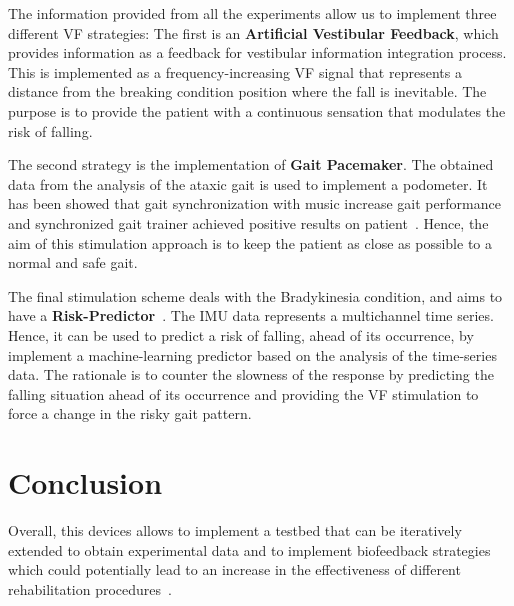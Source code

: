 \documentclass[conference]{IEEEtran}
\begin{document}
The information provided from all the experiments allow us to implement three different VF strategies:  The first is an \textbf{Artificial Vestibular Feedback}, which provides information as a feedback for vestibular information integration process.  This is implemented as a frequency-increasing VF signal that represents a distance from the breaking condition position where the fall is inevitable.   The purpose is to provide the patient with a continuous sensation that modulates the risk of falling.

The second strategy is the implementation of \textbf{Gait Pacemaker}.  The obtained data from the analysis of the ataxic gait is used to implement a podometer.  It has been showed that gait synchronization with music increase gait performance~\cite{Roerdink.etal2007} and synchronized gait trainer achieved positive results on patient~\cite{Blicher.etal2009}.  Hence, the aim of this stimulation approach is to keep the patient as close as possible to a normal and safe gait.

The final stimulation scheme deals with the Bradykinesia condition, and aims to have a \textbf{Risk-Predictor}~\cite{Rahman.etal2022,Ali.etal2022}.  The IMU data  represents a multichannel time series.  Hence, it can be used to predict a risk of falling, ahead of its occurrence, by implement a machine-learning predictor based on the analysis of the time-series data.  The rationale is to counter the slowness of the response by predicting the falling situation ahead of its occurrence and providing the VF stimulation to force a change in the risky gait pattern.



\section*{Conclusion}
Overall, this devices allows to implement a testbed that can be iteratively extended to obtain experimental data and to implement biofeedback strategies which could potentially lead to an increase in the effectiveness of different rehabilitation procedures~\cite{Bowman2021}.
\end{document}
